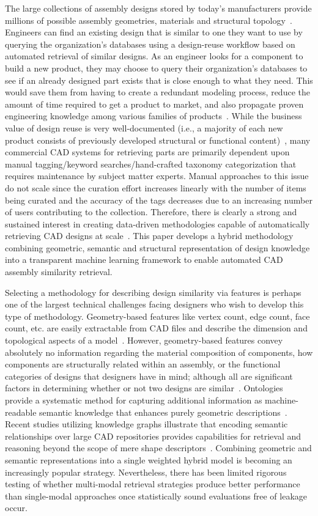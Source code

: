 \documentclass[preprint,12pt]{elsarticle}
\begin{document}
The large collections of assembly designs stored by today's manufacturers provide millions of possible assembly geometries, materials and structural topology~\cite{Bharadwaj2022}.
Engineers can find an existing design that is similar to one they want to use by querying the organization's databases using a design-reuse workflow based on automated retrieval of similar designs.
As an engineer looks for a component to build a new product, they may choose to query their organization's databases to see if an already designed part exists that is close enough to what they need.
This would save them from having to create a redundant modeling process, reduce the amount of time required to get a product to market, and also propagate proven engineering knowledge among various families of products~\cite{Li2025}.
While the business value of design reuse is very well-documented (i.e., a majority of each new product consists of previously developed structural or functional content)~\cite{Kwon2024}, many commercial CAD systems for retrieving parts are primarily dependent upon manual tagging/keyword searches/hand-crafted taxonomy categorization that requires maintenance by subject matter experts.
Manual approaches to this issue do not scale since the curation effort increases linearly with the number of items being curated and the accuracy of the tags decreases due to an increasing number of users contributing to the collection.
Therefore, there is clearly a strong and sustained interest in creating data-driven methodologies capable of automatically retrieving CAD designs at scale~\cite{Herzog2023}.
This paper develops a hybrid methodology combining geometric, semantic and structural representation of design knowledge into a transparent machine learning framework to enable automated CAD assembly similarity retrieval.

Selecting a methodology for describing design similarity via features is perhaps one of the largest technical challenges facing designers who wish to develop this type of methodology.
Geometry-based features like vertex count, edge count, face count, etc. are easily extractable from CAD files and describe the dimension and topological aspects of a model~\cite{Hou2023}.
However, geometry-based features convey absolutely no information regarding the material composition of components, how components are structurally related within an assembly, or the functional categories of designs that designers have in mind; although all are significant factors in determining whether or not two designs are similar~\cite{Gruber1993}.
Ontologies provide a systematic method for capturing additional information as machine-readable semantic knowledge that enhances purely geometric descriptions~\cite{Pan2024}.
Recent studies utilizing knowledge graphs illustrate that encoding semantic relationships over large CAD repositories provides capabilities for retrieval and reasoning beyond the scope of mere shape descriptors~\cite{Bharadwaj2022}.
Combining geometric and semantic representations into a single weighted hybrid model is becoming an increasingly popular strategy.
Nevertheless, there has been limited rigorous testing of whether multi-modal retrieval strategies produce better performance than single-modal approaches once statistically sound evaluations free of leakage occur.
\end{document}
